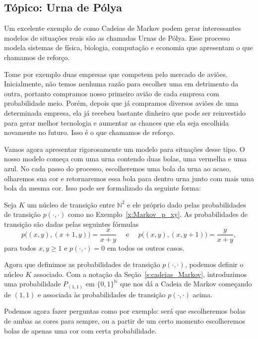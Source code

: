 \begin{topics}

\section{Tópico: Urna de Pólya}

Um excelente exemplo de como Cadeias de Markov podem gerar interessantes modelos de situações reais são as chamadas Urnas de Pólya.
Esse processo modela sistemas de física, biologia, computação e economia que apresentam o que chamamos de reforço.

Tome por exemplo duas empresas que competem pelo mercado de aviões.
Inicialmente, não temos nenhuma razão para escolher uma em detrimento da outra, portanto compramos nosso primeiro avião de cada empresa com probabilidade meio.
Porém, depois que já compramos diversos aviões de uma determinada empresa, ela já recebeu bastante dinheiro que pode ser reinvestido para gerar melhor tecnologia e aumentar as chances que ela seja escolhida novamente no futuro.
Isso é o que chamamos de reforço.

Vamos agora apresentar rigorosamente um modelo para situações desse tipo.
O nosso modelo começa com uma urna contendo duas bolas, uma vermelha e uma azul.
No cada passo do processo, escolheremos uma bola da urna ao acaso, olharemos sua cor e retornaremos essa bola para dentro urna junto com mais uma bola da mesma cor.
Isso pode ser formalizado da seguinte forma:

Seja $K$ um núcleo de transição entre $\mathbb{N}^2$ e ele próprio dado pelas probabilidades de transição $p(\cdot, \cdot)$ como no Exemplo~\ref{x:Markov_p_xy}.
As probabilidades de transição são dadas pelas seguintes fórmulas
\begin{equation}
  \label{e:p_xy_Polya}
  p\big( (x,y), (x + 1, y) \big) = \frac{x}{x + y} \quad \text{ e } \quad p\big( (x,y), (x, y + 1) \big) = \frac{y}{x + y},
\end{equation}
para todos $x, y \geq 1$ e $p(\cdot, \cdot) = 0$ em todos os outros casos.

Agora que definimos as probabilidades de transição $p(\cdot, \cdot)$, podemos definir o núcleo $K$ associado.
Com a notação da Seção~\ref{s:cadeias_Markov}, introduzimos uma probabilidade $P_{(1,1)}$ em $\{0,1\}^{\mathbb{N}}$ que nos dá a Cadeia de Markov começando de $(1,1)$ e associada às probabilidades de transição $p(\cdot, \cdot)$ acima.

Podemos agora fazer perguntas como por exemplo: será que escolheremos bolas de ambas as cores para sempre, ou a partir de um certo momento escolheremos bolas de apenas uma cor com certa probabilidade.


\end{topics}
